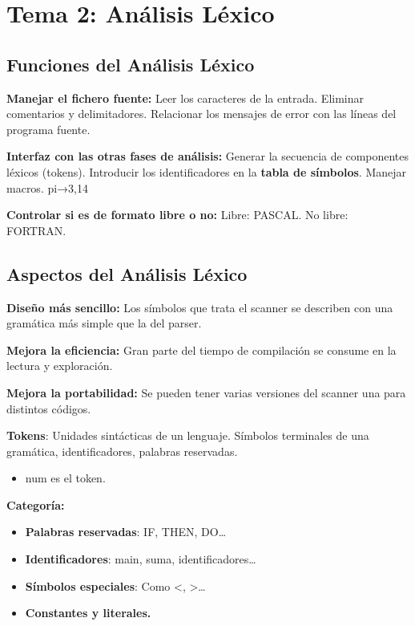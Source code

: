 \documentclass[12pt, twoside, openright]{report} %
\begin{document}
\chapter{Tema 2: Análisis Léxico}

\begin{figure}[H]
	{\def\svgwidth{.8\textwidth}
		}
\end{figure}

\section{Funciones del Análisis Léxico}

\textbf{Manejar el fichero fuente:} Leer los caracteres de la entrada.
Eliminar comentarios y delimitadores. Relacionar los mensajes de error
con las líneas del programa fuente.

\textbf{Interfaz con las otras fases de análisis:} Generar la secuencia
de componentes léxicos (tokens). Introducir los identificadores en la
\textbf{tabla de símbolos}. Manejar macros. pi→3,14

\textbf{Controlar si es de formato libre o no:} Libre: PASCAL. No libre:
FORTRAN.


\section{Aspectos del Análisis Léxico}

\textbf{Diseño más sencillo:} Los símbolos que trata el scanner se
describen con una gramática más simple que la del parser.

\textbf{Mejora la eficiencia:} Gran parte del tiempo de compilación se
consume en la lectura y exploración.

\textbf{Mejora la portabilidad:} Se pueden tener varias versiones del
scanner una para distintos códigos.

\textbf{Tokens}: Unidades sintácticas de un lenguaje. Símbolos
terminales de una gramática, identificadores, palabras reservadas.

\begin{itemize}
	\item num es el token.
\end{itemize}

\textbf{Categoría:}

\begin{itemize}
	\item \textbf{Palabras reservadas}: IF, THEN, DO\ldots{}
	\item \textbf{Identificadores}: main, suma, identificadores\ldots{}
	\item \textbf{Símbolos especiales}: Como \textless, \textgreater\ldots{}
	\item \textbf{Constantes y literales.}
\end{itemize}
\end{document}

